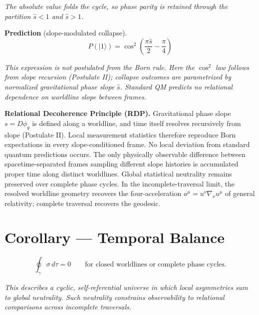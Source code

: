 \documentclass[12pt]{article}
\begin{document}
\vspace{1.0em}
\textit{The absolute value folds the cycle, so phase parity is retained through the partition $\hat{s}<1$ and $\hat{s}>1$.}
\vspace{.8em}

\vspace{1.0em}
\noindent\textbf{Prediction} (slope-modulated collapse).
\[
P(\lvert 1 \rangle) = \cos^{2}\!\left(\frac{\pi \hat{s}}{2} - \frac{\pi}{4}\right)
\]

\vspace{0.6em}
\textit{This expression is not postulated from the Born rule. Here the $\cos^{2}$ law follows from slope recursion (Postulate II); collapse outcomes are parametrized by normalized gravitational phase slope $\hat{s}$. Standard QM predicts no relational dependence on worldline slope between frames.}

\newpage

\vspace{0.8em}

\vspace{0.6em}

\textbf{Relational Decoherence Principle (RDP).}  
Gravitational phase slope $s = D\phi_g$ is defined along a worldline, and time itself resolves recursively from slope (Postulate II). Local measurement statistics therefore reproduce Born expectations in every slope-conditioned frame. No local deviation from standard quantum predictions occurs. The only physically observable difference between spacetime-separated frames sampling different slope histories is accumulated proper time along distinct worldlines. Global statistical neutrality remains preserved over complete phase cycles. In the incomplete-traversal limit, the resolved worldline geometry 
recovers the four-acceleration $a^\mu = u^\nu\nabla_\nu u^\mu$ of 
general relativity; complete traversal recovers the geodesic.

\section*{Corollary — Temporal Balance}

\[
\oint_\gamma \sigma \, d\tau = 0
\qquad
\text{for closed worldlines or complete phase cycles.}
\]

\vspace{0.5em}
\textit{This describes a cyclic, self-referential universe in which local asymmetries sum to global neutrality. Such neutrality constrains observability to relational comparisons across incomplete traversals.}
\end{document}
